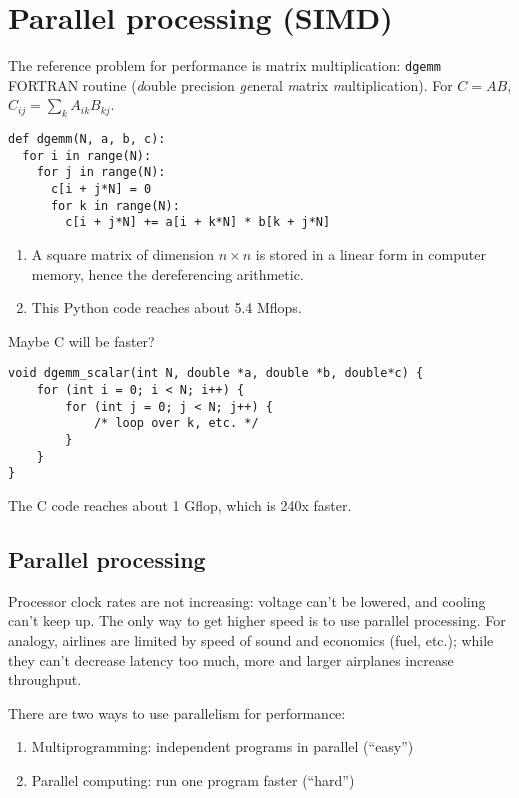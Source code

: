 \chapter{Parallel processing (SIMD)}
The reference problem for performance is matrix multiplication:
\texttt{dgemm} FORTRAN routine (\emph{d}ouble precision \emph{ge}neral \emph{m}atrix \emph{m}ultiplication).
For \(C = AB\), \(C_{ij} = \sum_k A_{ik}B_{kj}\).
\begin{verbatim}
def dgemm(N, a, b, c):
  for i in range(N):
    for j in range(N):
      c[i + j*N] = 0
      for k in range(N):
        c[i + j*N] += a[i + k*N] * b[k + j*N]
\end{verbatim}
\begin{enumerate}
	\item A square matrix of dimension \(n\times n\) is stored in a linear form in computer memory, hence the dereferencing arithmetic.
	\item This Python code reaches about 5.4 Mflops.
\end{enumerate}
Maybe C will be faster?
\begin{verbatim}
void dgemm_scalar(int N, double *a, double *b, double*c) {
	for (int i = 0; i < N; i++) {
		for (int j = 0; j < N; j++) {
			/* loop over k, etc. */
		}
	}
}
\end{verbatim}
The C code reaches about 1 Gflop, which is 240x faster.

\section{Parallel processing}
Processor clock rates are not increasing: voltage can't be lowered,
and cooling can't keep up.
The only way to get higher speed is to use parallel processing.
For analogy, airlines are limited by speed of sound and economics (fuel, etc.);
while they can't decrease latency too much, more and larger airplanes increase throughput.

There are two ways to use parallelism for performance:
\begin{enumerate}
	\item Multiprogramming: independent programs in parallel (``easy'')
	\item Parallel computing: run one program faster (``hard'')
\end{enumerate}

